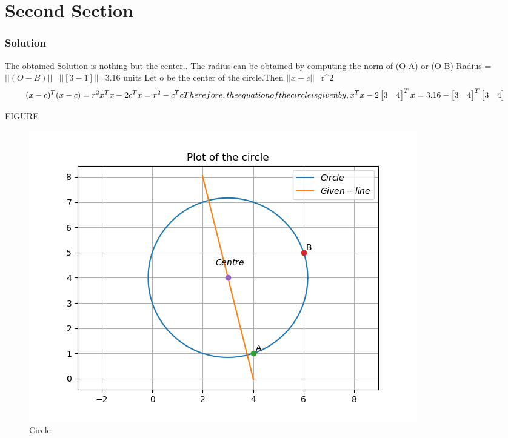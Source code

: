 \documentclass{beamer}
\begin{document}
\section{Second Section}
\begin{frame}
\frametitle{Solution}
The obtained Solution is nothing but the center..
\newline The radius can be obtained by computing the norm of (O-A) or (O-B)
\newline Radius = $||(O-B)||$=$||[3 - 1]||$=3.16 units
\newline Let o be the center of the circle.Then
\newline\centering $||x-c||$=r^2
\newline\begin{equation}
    (x-c)^T(x-c)=r^2\\
    x^Tx-2c^Tx=r^2-c^Tc\\
\newline \newline Therefore,the equation of the circle is given by,
\newline\newline x^Tx-2\begin{bmatrix}
    3&4
    \end{bmatrix}^Tx=3.16-\begin{bmatrix}
    3&4
    \end{bmatrix}^T\begin{bmatrix}
    3&4
    \end{bmatrix}
\end{equation}
\end{frame}
\begin{frame}{FIGURE}
\begin{figure}
    \centering
    \includegraphics[scale=0.65]{Circle.png}
    \caption{Circle}
\end{figure}
\end{frame}
\end{document}
